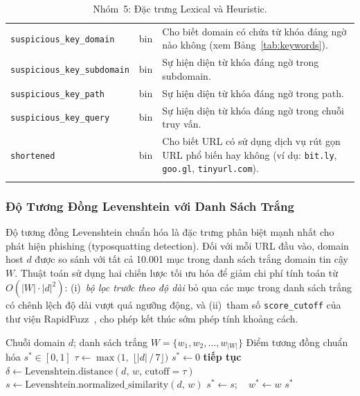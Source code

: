\documentclass[a4paper,12pt]{article}
\begin{document}
\begin{longtable}{p{5.8cm}p{1.2cm}p{6cm}}
\texttt{suspicious\_key\_domain} & bin &
    Cho biết domain có chứa từ khóa đáng ngờ nào không (xem Bảng~\ref{tab:keywords}). \\
\texttt{suspicious\_key\_subdomain} & bin &
    Sự hiện diện từ khóa đáng ngờ trong subdomain. \\
\texttt{suspicious\_key\_path} & bin &
    Sự hiện diện từ khóa đáng ngờ trong path. \\
\texttt{suspicious\_key\_query} & bin &
    Sự hiện diện từ khóa đáng ngờ trong chuỗi truy vấn. \\
\texttt{shortened} & bin &
    Cho biết URL có sử dụng dịch vụ rút gọn URL phổ biến hay không (ví dụ: \texttt{bit.ly}, \texttt{goo.gl}, \texttt{tinyurl.com}). \\
\bottomrule
\caption{Nhóm~5: Đặc trưng Lexical và Heuristic.}
\label{tab:lexical}
\end{longtable}

\subsubsection{Độ Tương Đồng Levenshtein với Danh Sách Trắng}
\label{sec:levenshtein}

Độ tương đồng Levenshtein chuẩn hóa là đặc trưng phân biệt mạnh nhất cho phát hiện phishing (typosquatting detection). Đối với mỗi URL đầu vào, domain host $d$ được so sánh với tất cả 10.001 mục trong danh sách trắng domain tin cậy $W$. Thuật toán sử dụng hai chiến lược tối ưu hóa để giảm chi phí tính toán từ $O(|W| \cdot |d|^2)$: (i)~\textit{bộ lọc trước theo độ dài} bỏ qua các mục trong danh sách trắng có chênh lệch độ dài vượt quá ngưỡng động, và (ii)~tham số \texttt{score\_cutoff} của thư viện RapidFuzz~\cite{rapidfuzz}, cho phép kết thúc sớm phép tính khoảng cách.

\begin{algorithm}[H]
\caption{Độ tương đồng Levenshtein tối ưu với danh sách trắng.}
\label{alg:levenshtein}
\begin{algorithmic}[1]
\Require Chuỗi domain $d$; danh sách trắng $W = \{w_1, w_2, \ldots, w_{|W|}\}$
\Ensure Điểm tương đồng chuẩn hóa $s^* \in [0, 1]$
\State $\tau \gets \max\!\bigl(1,\; \lfloor |d|\,/\,7 \rfloor\bigr)$ 
\State $s^* \gets 0$
     \textbf{tiếp tục} 
    \EndIf
    \State $\delta \gets \mathrm{Levenshtein.distance}(d,\, w,\, \mathrm{cutoff}{=}\tau)$
    \If{$\delta \leq \tau$}
        \State $s \gets \mathrm{Levenshtein.normalized\_similarity}(d,\, w)$
            \State $s^* \gets s;\quad w^* \gets w$
        \EndIf
    \EndIf
\EndFor
\State \Return $s^*$
\end{algorithmic}
\end{algorithm}
\end{document}
